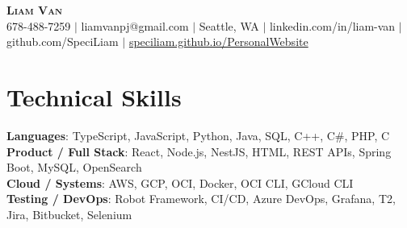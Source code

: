 \documentclass[letterpaper,11pt]{article}
\begin{document}

%
\begin{center}
    \textbf{\Huge \scshape Liam Van} \\ \vspace{1pt}
    \small 678-488-7259 $|$ \small {liamvanpj@gmail.com} $|$ Seattle, WA
 {{$|$ linkedin.com/in/liam-van} {$|$ github.com/SpeciLiam} {$|$ \href{https://speciliam.github.io/PersonalWebsite}{speciliam.github.io/PersonalWebsite}}}

\end{center}

\section{Technical Skills}
 \begin{itemize}[leftmargin=0.15in, label={}]
    \small{\item{
     \textbf{Languages}{: TypeScript, JavaScript, Python, Java, SQL, C++, C\#, PHP, C} \\
     \textbf{Product / Full Stack}{: React, Node.js, NestJS, HTML, REST APIs, Spring Boot, MySQL, OpenSearch} \\
     \textbf{Cloud / Systems}{: AWS, GCP, OCI, Docker, OCI CLI, GCloud CLI} \\
     \textbf{Testing / DevOps}{: Robot Framework, CI/CD, Azure DevOps, Grafana, T2, Jira, Bitbucket, Selenium} \\
    }}
 \end{itemize}
%
\end{document}

